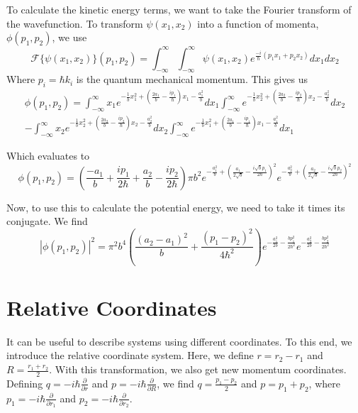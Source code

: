 To calculate the kinetic energy terms, we want to take the Fourier transform of the wavefunction. To transform $\psi(x_1, x_2)$ into a function of momenta, $\phi(p_1, p_2)$, we use
\begin{equation}
    \mathcal{F}\{\psi(x_1, x_2)\}(p_1, p_2) = 
    \int_{-\infty}^{\infty} 
    \int_{-\infty}^{\infty} \psi(x_1, x_2)e^{\frac{-i}{\hbar} (p_1 x_1 + p_2 x_2)}dx_1 dx_2 
\end{equation} 
Where $p_i = \hbar k_i$ is the quantum mechanical momentum.
This gives us
\begin{equation}
    \begin{split}
        \phi(p_1, p_2) = 
        \int_{-\infty}^{\infty} x_1 e^{-\frac{1}{b}x_1^2 + (\frac{2 a_1}{b} - \frac{i p_1}{\hbar}) x_1 - \frac{a_1^2}{b}} dx_1 
        \int_{-\infty}^{\infty} e^{-\frac{1}{b}x_2^2 + (\frac{2 a_2}{b} - \frac{i p_2}{\hbar}) x_2 - \frac{a_2^2}{b}} dx_2 \\ - 
        \int_{-\infty}^{\infty} x_2 e^{-\frac{1}{b}x_2^2 + (\frac{2 a_2}{b} - \frac{i p_2}{\hbar}) x_2 - \frac{a_2^2}{b}} dx_2 
        \int_{-\infty}^{\infty} e^{-\frac{1}{b}x_1^2 + (\frac{2 a_1}{b} - \frac{i p_1}{\hbar}) x_1 - \frac{a_1^2}{b}} dx_1 
    \end{split}
\end{equation}

Which evaluates to 
\begin{equation}
    \phi(p_1, p_2) = 
    (\frac{-a_1}{b}+\frac{ip_1}{2 \hbar} + \frac{a_2}{b} - \frac{i p_2}{2 \hbar}) \pi b^2 
    e^{- \frac{a_1^2}{b} + (\frac{a_1}{2 \sqrt{b}} - \frac{i \sqrt{b} p_1}{2 \hbar})^2} 
    e^{- \frac{a_2^2}{b} + (\frac{a_2}{2 \sqrt{b}} - \frac{i \sqrt{b} p_2}{2 \hbar})^2}
\end{equation}

Now, to use this to calculate the potential energy, we need to take it times its conjugate.
We find
\begin{equation}
    |\phi(p_1, p_2)|^2 = 
    \pi^2 b^4 \left(\frac{(a_2-a_1)^2}{b} + \frac{(p_1 - p_2)^2}{4 \hbar^2} \right) 
    e^{-\frac{a_1^2}{2b} -\frac{bp_1^2}{2\hbar^2}}
    e^{-\frac{a_2^2}{2b} - \frac{bp_2^2}{2\hbar^2}}
\end{equation}

\section{Relative Coordinates}
It can be useful to describe systems using different coordinates. To this end, we introduce the relative coordinate system. Here, we define $r = r_2 - r_1$ and $R = \frac{r_1 + r_2}{2}$. With this transformation, we also get new momentum coordinates. Defining $q = -i \hbar \frac{\partial}{\partial r}$ and $p = - i \hbar \frac{\partial}{\partial R}$, we find $q = \frac{p_1 - p_2}{2}$ and $p = p_1 + p_2$, where $p_1 = -i \hbar \frac{\partial}{\partial r_1}$ and $p_2 = -i \hbar \frac{\partial}{\partial r_2}$. 

